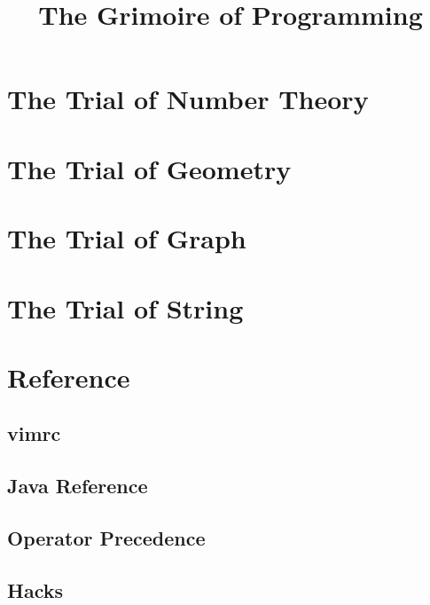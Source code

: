 \documentclass[a4paper]{report}
\title{The Grimoire of Programming}
\date{}
\author{}
\begin{document}
	\maketitle
	\chapter{The Trial of Number Theory}
		
	\chapter{The Trial of Geometry}
		
	\chapter{The Trial of Graph}
		
	\chapter{The Trial of String}
		
	\chapter{Reference}
		\section{vimrc}
			
		\section{Java Reference}
			
		\section{Operator Precedence}
			
		\section{Hacks}
			
\end{document}
